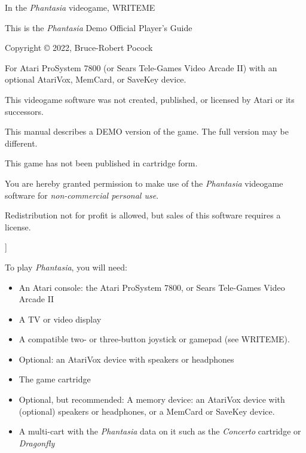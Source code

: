 \documentclass[10pt,twocolumn,openany,article]{memoir}
\begin{document}
\bigskip

In the  \textit{Phantasia} videogame, WRITEME

\vspace{1in}\vfill

This is the \textit{Phantasia} \ifdefined\DEMO Demo \else Official \fi Player's Guide

Copyright \copyright{} 2022, Bruce-Robert Pocock

\bigskip

For Atari ProSystem  7800 (or Sears Tele-Games Video Arcade  II) with an
optional AtariVox, MemCard, or SaveKey device.

\bigskip

This videogame software was not created, published, or licensed by Atari
or its successors.

\ifdefined\DEMO
\bigskip

This manual describes  a DEMO version of the game.  The full version may
be different.

\fi

This game has not been published in cartridge form.

\bigskip

You are hereby granted permission  to make use of the \textit{Phantasia}
videogame software for \emph{non-commercial personal use}.

Redistribution not for profit is allowed, but sales of this software
requires a license.

]

\let\cleardoublepage\clearpage

\mainmatter

\tableofcontents


To play \textit{Phantasia}, you will need:

\begin{itemize}

\item An Atari console: the Atari ProSystem 7800, or Sears
  Tele-Games Video Arcade II
\item A TV or video display
\item A compatible two- or three-button joystick or gamepad (see WRITEME).

  \ifdefined\ATARIAGE
\item Optional: an AtariVox device with speakers or headphones
\item The  game cartridge
  \else
\item Optional,  but recommended:  A memory  device: an  AtariVox device
  with  (optional)  speakers or  headphones,  or  a MemCard  or  SaveKey
  device.
\item A  multi-cart with the  \textit{Phantasia} data  on it such  as the
  \textit{Concerto} cartridge or \textit{Dragonfly}
  \fi
\end{itemize}
\end{document}
